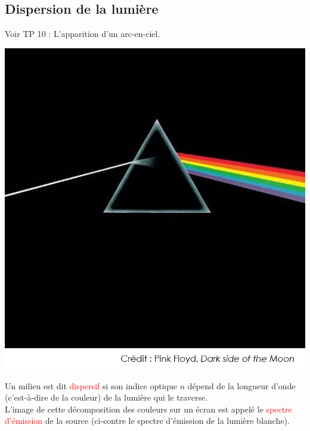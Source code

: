 \subsection{Dispersion de la lumière}
\begin{Large}
\end{Large}
Voir TP 10 : L'apparition d'un arc-en-ciel.
\begin{multicols}{2}
    \begin{center}
        \includegraphics[scale=0.5]{Images/Cours/Chapitre_4/Pink_floyd.png}
    \end{center}
    
    \begin{tcolorbox}[colback=green!5!white,colframe=green!75!black,title=\textbf{Milieu dispersif et spectre:}]
Un milieu est dit \textcolor{red}{dispersif} si son indice optique $n$ dépend de la longueur d'onde (c'est-à-dire de la couleur) de la lumière qui le traverse.\\

L'image de cette décomposition des couleurs sur un écran est appelé le \textcolor{red}{spectre d'émission} de la source (ci-contre le spectre d'émission de la lumière blanche).
\end{tcolorbox}
\end{multicols}

